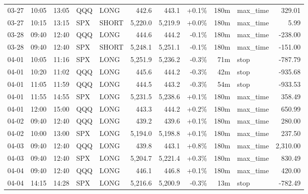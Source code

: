 \documentclass[11pt,a4paper,twoside]{article}
\begin{document}
\begin{center}
\begin{longtable}{>{\color{txtmain}}l l l l l r r r r >{\color{txtmain}}l r}
03-27 & 10:05 & 13:05 & QQQ & LONG & 442.6 & 443.1 & \textcolor{wingreen}{+0.1\%} & 180m & max\_time & \textcolor{wingreen}{329.01} \\
03-27 & 10:15 & 13:15 & SPX & SHORT & 5,220.0 & 5,219.9 & \textcolor{wingreen}{+0.0\%} & 180m & max\_time & \textcolor{wingreen}{5.99} \\
03-28 & 09:40 & 12:40 & QQQ & LONG & 444.6 & 444.2 & \textcolor{lossred}{-0.1\%} & 180m & max\_time & \textcolor{lossred}{-238.00} \\
03-28 & 09:40 & 12:40 & SPX & SHORT & 5,248.1 & 5,251.1 & \textcolor{lossred}{-0.1\%} & 180m & max\_time & \textcolor{lossred}{-151.00} \\
04-01 & 10:05 & 11:16 & SPX & LONG & 5,251.9 & 5,236.2 & \textcolor{lossred}{-0.3\%} & 71m & stop & \textcolor{lossred}{-787.79} \\
04-01 & 10:20 & 11:02 & QQQ & LONG & 445.6 & 444.2 & \textcolor{lossred}{-0.3\%} & 42m & stop & \textcolor{lossred}{-935.68} \\
04-01 & 11:05 & 11:59 & QQQ & LONG & 444.5 & 443.2 & \textcolor{lossred}{-0.3\%} & 54m & stop & \textcolor{lossred}{-933.53} \\
04-01 & 11:55 & 14:55 & SPX & LONG & 5,231.5 & 5,238.6 & \textcolor{wingreen}{+0.1\%} & 180m & max\_time & \textcolor{wingreen}{358.49} \\
04-01 & 12:00 & 15:00 & QQQ & LONG & 443.3 & 444.2 & \textcolor{wingreen}{+0.2\%} & 180m & max\_time & \textcolor{wingreen}{650.99} \\
04-02 & 09:40 & 12:40 & QQQ & LONG & 439.2 & 439.6 & \textcolor{wingreen}{+0.1\%} & 180m & max\_time & \textcolor{wingreen}{280.00} \\
04-02 & 10:00 & 13:00 & SPX & LONG & 5,194.0 & 5,198.8 & \textcolor{wingreen}{+0.1\%} & 180m & max\_time & \textcolor{wingreen}{237.50} \\
04-03 & 09:40 & 12:40 & QQQ & LONG & 439.8 & 443.1 & \textcolor{wingreen}{+0.8\%} & 180m & max\_time & \textcolor{wingreen}{2,310.00} \\
04-03 & 09:40 & 12:40 & SPX & LONG & 5,204.7 & 5,221.4 & \textcolor{wingreen}{+0.3\%} & 180m & max\_time & \textcolor{wingreen}{830.49} \\
04-04 & 09:40 & 12:40 & QQQ & LONG & 446.1 & 446.8 & \textcolor{wingreen}{+0.1\%} & 180m & max\_time & \textcolor{wingreen}{420.00} \\
04-04 & 14:15 & 14:28 & SPX & LONG & 5,216.6 & 5,200.9 & \textcolor{lossred}{-0.3\%} & 13m & stop & \textcolor{lossred}{-782.49} \\

\end{longtable}
\end{center}
\end{document}
